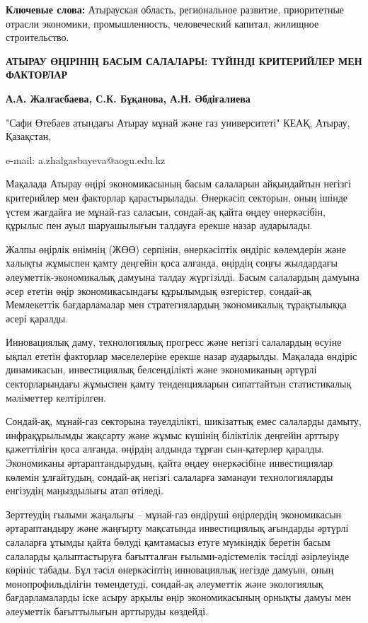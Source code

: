 {\bfseries Ключевые слова:} Атырауская область, региональное развитие,
приоритетные отрасли экономики, промышленность, человеческий капитал,
жилищное строительство.

\begin{articleheader}
{\bfseries АТЫРАУ ӨҢІРІНІҢ БАСЫМ САЛАЛАРЫ: ТҮЙІНДІ КРИТЕРИЙЛЕР МЕН ФАКТОРЛАР}

{\bfseries
А.А. Жалғасбаева\textsuperscript{\envelope },
С.К. Бұқанова,
А.Н. Әбдіғалиева
}
\end{articleheader}

\begin{affiliation}
"Сафи Өтебаев атындағы Атырау мұнай және газ университеті" КЕАҚ, Атырау, Қазақстан,

e-mail: a.zhalgasbayeva@aogu.edu.kz
\end{affiliation}

Мақалада Атырау өңірі экономикасының басым салаларын айқындайтын негізгі
критерийлер мен факторлар қарастырылады. Өнеркәсіп секторын, оның ішінде
үстем жағдайға ие мұнай-газ саласын, сондай-ақ қайта өңдеу өнеркәсібін,
құрылыс пен ауыл шаруашылығын талдауға ерекше назар аударылады.

Жалпы өңірлік өнімнің (ЖӨӨ) серпінін, өнеркәсіптік өндіріс көлемдерін
және халықты жұмыспен қамту деңгейін қоса алғанда, өңірдің соңғы
жылдардағы әлеуметтік-экономикалық дамуына талдау жүргізілді. Басым
салалардың дамуына әсер ететін өңір экономикасындағы құрылымдық
өзгерістер, сондай-ақ Мемлекеттік бағдарламалар мен стратегиялардың
экономикалық тұрақтылыққа әсері қаралды.

Инновациялық даму, технологиялық прогресс және негізгі салалардың өсуіне
ықпал ететін факторлар мәселелеріне ерекше назар аударылды. Мақалада
өндіріс динамикасын, инвестициялық белсенділікті және экономиканың
әртүрлі секторларындағы жұмыспен қамту тенденцияларын сипаттайтын
статистикалық мәліметтер келтірілген.

Сондай-ақ, мұнай-газ секторына тәуелділікті, шикізаттық емес салаларды
дамыту, инфрақұрылымды жақсарту және жұмыс күшінің біліктілік деңгейін
арттыру қажеттілігін қоса алғанда, өңірдің алдында тұрған сын-қатерлер
қаралды. Экономиканы әртараптандырудың, қайта өңдеу өнеркәсібіне
инвестициялар көлемін ұлғайтудың, сондай-ақ негізгі салаларға заманауи
технологияларды енгізудің маңыздылығы атап өтіледі.

Зерттеудің ғылыми жаңалығы -- мұнай-газ өндіруші өңірлердің экономикасын
әртараптандыру және жаңғырту мақсатында инвестициялық ағындарды әртүрлі
салаларға ұтымды қайта бөлуді қамтамасыз етуге мүмкіндік беретін басым
салаларды қалыптастыруға бағытталған ғылыми-әдістемелік тәсілді
әзірлеуінде көрініс табады. Бұл тәсіл өнеркәсіптің инновациялық негізде
дамуын, оның монопрофильділігін төмендетуді, сондай-ақ әлеуметтік және
экологиялық бағдарламаларды іске асыру арқылы өңір экономикасының
орнықты дамуы мен әлеуметтік бағыттылығын арттыруды көздейді.

